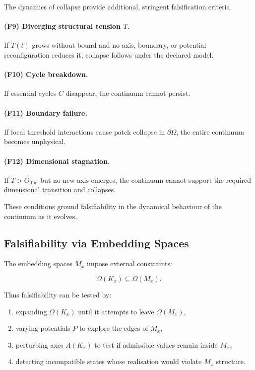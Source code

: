 The dynamics of collapse provide additional, stringent falsification
criteria.

\paragraph{(F9) Diverging structural tension \texorpdfstring{$T$}{T}.}
If $T(t)$ grows without bound and no axis, boundary, or potential
reconfiguration reduces it, collapse follows under the declared model.

\paragraph{(F10) Cycle breakdown.}
If essential cycles $C$ disappear, the continuum cannot persist.

\paragraph{(F11) Boundary failure.}
If local threshold interactions cause patch collapse in $\partial\Omega$,
the entire continuum becomes unphysical.

\paragraph{(F12) Dimensional stagnation.}
If $T > \Theta_{\mathrm{dim}}$ but no new axis emerges, the continuum
cannot support the required dimensional transition and collapses.

These conditions ground falsifiability in the dynamical behaviour of
the continuum as it evolves.



\subsection{Falsifiability via Embedding Spaces}

The embedding spaces $M_x$ impose external constraints:

\[
\Omega(K_x) \subseteq \Omega(M_x).
\]

Thus falsifiability can be tested by:

\begin{enumerate}
    \item expanding $\Omega(K_x)$ until it attempts to leave
          $\Omega(M_x)$,
    \item varying potentials $P$ to explore the edges of $M_x$,
    \item perturbing axes $A(K_x)$ to test if admissible values remain
          inside $M_x$,
    \item detecting incompatible states whose realisation would violate
          $M_x$ structure.
\end{enumerate}

